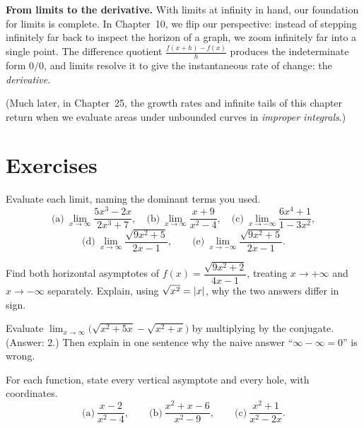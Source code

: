 \begin{connectionbox}
\textbf{From limits to the derivative.}
With limits at infinity in hand, our foundation for limits is complete. In
Chapter~10, we flip our perspective: instead of stepping infinitely far back
to inspect the horizon of a graph, we zoom infinitely far into a single point.
The difference quotient $\frac{f(x+h)-f(x)}{h}$ produces the indeterminate form
$0/0$, and limits resolve it to give the instantaneous rate of change: the
\emph{derivative}.

(Much later, in Chapter~25, the growth rates and infinite tails of this chapter
return when we evaluate areas under unbounded curves in \emph{improper integrals}.)
\end{connectionbox}

\section{Exercises}
\label{ch09:exercises}

\begin{exercise}
Evaluate each limit, naming the dominant terms you used.
\[
\text{(a)}\ \lim_{x\to\infty}\frac{5x^3-2x}{2x^3+7},
\quad
\text{(b)}\ \lim_{x\to\infty}\frac{x+9}{x^2-4},
\quad
\text{(c)}\ \lim_{x\to-\infty}\frac{6x^4+1}{1-3x^2},
\]
\[
\text{(d)}\ \lim_{x\to\infty}\frac{\sqrt{9x^2+5}}{2x-1},
\qquad
\text{(e)}\ \lim_{x\to-\infty}\frac{\sqrt{9x^2+5}}{2x-1}.
\]
\end{exercise}

\begin{exercise}
Find both horizontal asymptotes of $f(x)=\dfrac{\sqrt{9x^2+2}}{4x-1}$, treating
$x\to+\infty$ and $x\to-\infty$ separately. Explain, using $\sqrt{x^2}=\lvert x\rvert$,
why the two answers differ in sign.
\end{exercise}

\begin{exercise}
Evaluate $\displaystyle\lim_{x\to\infty}\bigl(\sqrt{x^2+5x}-\sqrt{x^2+x}\bigr)$
by multiplying by the conjugate. (Answer: $2$.) Then explain in one sentence why
the naive answer ``$\infty-\infty=0$'' is wrong.
\end{exercise}

\begin{exercise}
For each function, state every vertical asymptote and every hole, with
coordinates.
\[
\text{(a)}\ \frac{x-2}{x^2-4},
\qquad
\text{(b)}\ \frac{x^2+x-6}{x^2-9},
\qquad
\text{(c)}\ \frac{x^2+1}{x^2-2x}.
\]
\end{exercise}

